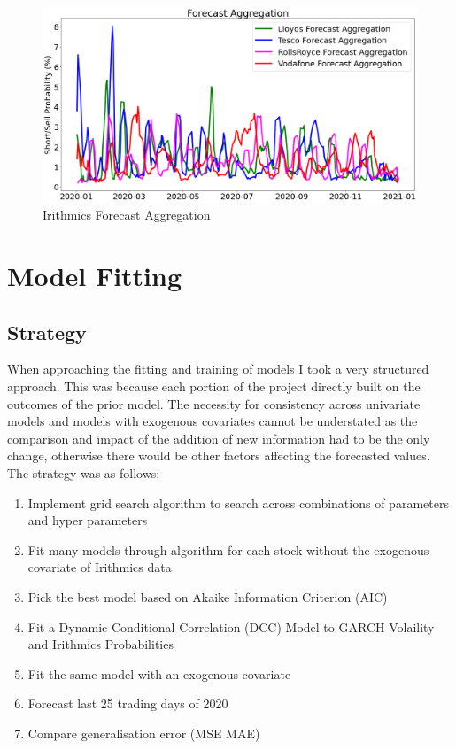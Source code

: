 \begin{figure}[H]
\centering
\includegraphics[scale=0.35]{images/Exploratory/forcAgg.png}
\caption{Irithmics Forecast Aggregation}
\label{fig: Irith Forecast Agg}
\end{figure}


\section{Model Fitting}
\subsection{Strategy}

When approaching the fitting and training of models I took a very structured approach. This was because each portion of the project directly built on the outcomes of the prior model. The necessity for consistency across univariate models and models with exogenous covariates cannot be understated as the comparison and impact of the addition of new information had to be the only change, otherwise there would be other factors affecting the forecasted values. The strategy was as follows:

\begin{enumerate}
    \item Implement grid search algorithm to search across combinations of parameters and hyper parameters
    \item Fit many models through algorithm for each stock without the exogenous covariate of Irithmics data
    \item Pick the best model based on Akaike Information Criterion (AIC)
    \item Fit a Dynamic Conditional Correlation (DCC) Model to GARCH Volaility and Irithmics Probabilities
    \item Fit the same model with an exogenous covariate
    \item Forecast last 25 trading days of 2020
    \item Compare generalisation error (MSE MAE)
\end{enumerate}

